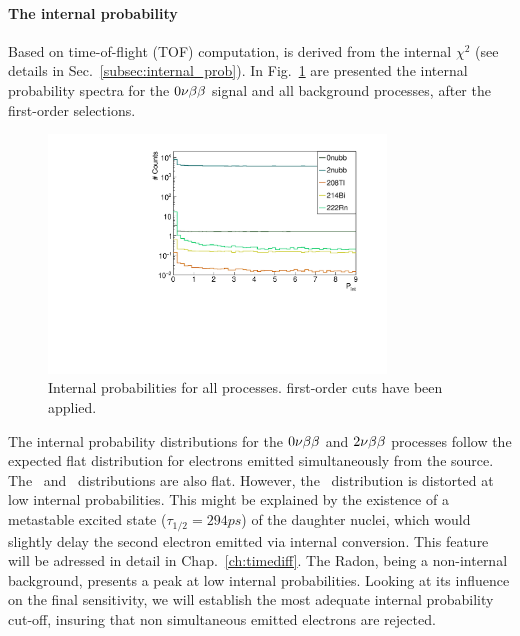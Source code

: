 \paragraph{The internal probability}
Based on time-of-flight (TOF) computation, is derived from the internal $\chi^{2}$ (see details in Sec.~\ref{subsec:internal_prob}).
In Fig.~\ref{fig:Pint} are presented the internal probability spectra for the $0\nu\beta\beta$ signal and all background processes, after the first-order selections.
\begin{figure}[h]
  \centering
  \includegraphics[width=0.8\textwidth]{Sensitivity/fig_sensitivity/InternalProbability.pdf}
  \caption{Internal probabilities for all processes.
    first-order cuts have been applied.
    \label{fig:Pint}}
\end{figure}
The internal probability distributions for the $0\nu\beta\beta$ and $2\nu\beta\beta$ processes follow the expected flat distribution for electrons emitted simultaneously from the source.
The \Tl\ and \Bi\ distributions are also flat.
However, the \Tl\ distribution is distorted at low internal probabilities.
This might be explained by the existence of a metastable excited state ($\tau_{1/2} = 294 ps$) of the daughter nuclei, which would slightly delay the second electron emitted via internal conversion.
This feature will be adressed in detail in Chap.~\ref{ch:timediff}.
The Radon, being a non-internal background, presents a peak at low internal probabilities.
Looking at its influence on the final sensitivity, we will establish the most adequate internal probability cut-off, insuring that non simultaneous emitted electrons are rejected.

